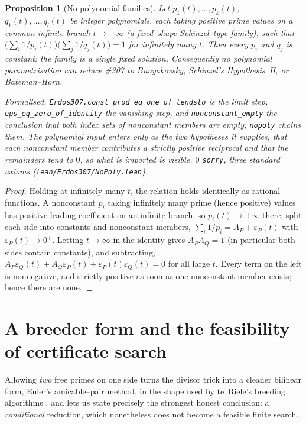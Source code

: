 \documentclass[11pt]{article}
\newtheorem{proposition}[theorem]{Proposition}
\theoremstyle{definition}
\begin{document}
\begin{proposition}[No polynomial families]\label{prop:nopoly}
Let $p_1(t),\dots,p_k(t)$, $q_1(t),\dots,q_l(t)$ be integer polynomials, each taking \emph{positive}
prime values on a common infinite branch $t\to+\infty$ (a fixed--shape Schinzel--type family), such
that
$\bigl(\sum_i1/p_i(t)\bigr)\bigl(\sum_j1/q_j(t)\bigr)=1$ for infinitely many $t$. Then every $p_i$ and
$q_j$ is constant: the family is a single fixed solution. Consequently no polynomial parametrisation can
reduce \#307 to Bunyakovsky, Schinzel's Hypothesis~H, or Bateman--Horn.

\textup{Formalised.} \texttt{Erdos307.const\_prod\_eq\_one\_of\_tendsto} is the limit step,
\texttt{eps\_eq\_zero\_of\_identity} the vanishing step, and \texttt{nonconstant\_empty} the
conclusion that both index sets of nonconstant members are empty; \texttt{nopoly} chains them. The
polynomial input enters only as the two hypotheses it supplies, that each nonconstant member
contributes a strictly positive reciprocal and that the remainders tend to $0$, so what is imported
is visible. $0$ \texttt{sorry}, three standard axioms
\textup{(\texttt{lean/Erdos307/NoPoly.lean})}.
\end{proposition}
\begin{proof}
Holding at infinitely many $t$, the relation holds identically as rational functions. A nonconstant
$p_i$ taking infinitely many prime (hence positive) values has positive leading coefficient on an
infinite branch, so $p_i(t)\to+\infty$ there; split each side into constants and nonconstant members,
$\sum_i1/p_i=A_P+\varepsilon_P(t)$ with $\varepsilon_P(t)\to0^+$. Letting $t\to\infty$ in the identity
gives $A_PA_Q=1$ (in particular both sides contain constants), and subtracting,
$A_P\varepsilon_Q(t)+A_Q\varepsilon_P(t)+\varepsilon_P(t)\varepsilon_Q(t)=0$ for all large $t$. Every
term on the left is nonnegative, and strictly positive as soon as one nonconstant member exists; hence
there are none.
\end{proof}

\section{A breeder form and the feasibility of certificate search}\label{sec:breeder}

Allowing \emph{two} free primes on one side turns the divisor trick into a cleaner bilinear form,
Euler's amicable--pair method, in the shape used by te~Riele's breeding algorithms
\cite{teRiele1984}, and lets us state precisely the strongest honest conclusion: a
\emph{conditional} reduction, which nonetheless does not become a feasible finite search.
\end{document}
